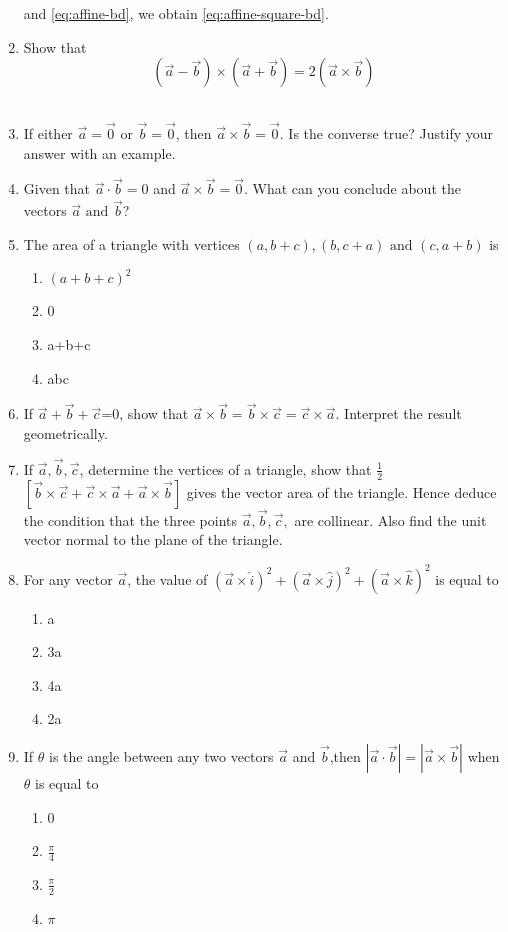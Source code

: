 \begin{enumerate}[label=\thesubsection.\arabic*.,ref=\thesubsection.\theenumi]
	and 
	\eqref{eq:affine-bd},
	we obtain \eqref{eq:affine-square-bd}.
\item Show that $$(\overrightarrow{a}-\overrightarrow{b})\times (\overrightarrow{a}+\overrightarrow{b})=2(\overrightarrow{a}\times \overrightarrow{b})$$
	\\
		\solution
		
\item If either $\overrightarrow{a} = \overrightarrow{0}$ or $\overrightarrow{b} = \overrightarrow{0}$, then $\overrightarrow{a} \times \overrightarrow{b} = \overrightarrow{0}$. Is the converse true? Justify your answer with an example.
	\\
		\solution
		
\item Given that $\overrightarrow{a} \cdot \overrightarrow{b} = 0$ and $\overrightarrow{a} \times \overrightarrow{b} = \overrightarrow{0}$. What can you conclude about the vectors $\overrightarrow{a} \text{ and }\overrightarrow{b}$?
\item The area of a triangle with vertices $(a,b+c), (b,c+a)\text{ and }(c,a+b)$ is
\begin{enumerate}
\item $(a+b+c)^2$
\item 0
\item a+b+c
\item abc 
\end{enumerate}
\item If $\vec{a}+\vec{b}+\vec{c}$=0, show that $\vec{a}\times\vec{b}=\vec{b}\times\vec{c}=\vec{c}\times\vec{a}$. Interpret the result geometrically.
\item If $\vec{a}, \vec{b}, \vec{c}$, determine the vertices of a triangle, show that $\frac{1}{2}$ $\left[\vec{b} \times\vec{c}+\vec{c} \times\vec{a}+\vec{a}\times\vec{b} \right]$ gives the vector area of the triangle. Hence deduce the condition that the three points $\vec{a},\vec{b},\vec{c},$ are collinear. Also find the unit vector normal to the plane of the triangle.
\item For any vector $\vec{a}$, the value of $(\vec{a}\times\hat{i})^2+(\vec{a}\times\hat{j})^2 + (\vec{a}\times\hat{k})^2$ is equal to 
	\begin{enumerate}
\item a 
\item 3a
\item 4a
\item 2a
\end{enumerate}
\item If $\theta$ is the angle between any two vectors $\vec{a}$ and $\vec{b}$,then $|\vec{a}\cdot\vec{b}|=|\vec{a}\times\vec{b}|$ when $\theta$ is equal to
\begin{enumerate}
\item 0
\item $\frac{\pi}{4}$
\item $\frac{\pi}{2}$
\item $\pi$
\end{enumerate}
\end{enumerate}

